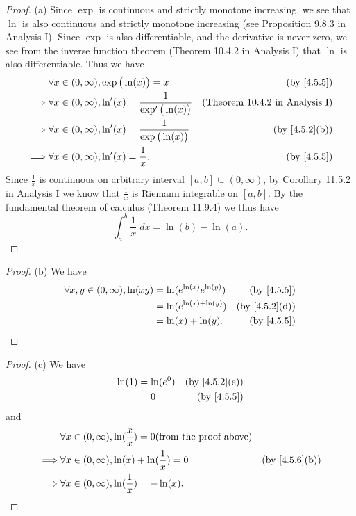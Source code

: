 \begin{proof}{(a)}
  Since \(\exp\) is continuous and strictly monotone increasing, we see that \(\ln\) is also continuous and strictly monotone increasing (see Proposition 9.8.3 in Analysis I).
  Since \(\exp\) is also differentiable, and the derivative is never zero, we see from the inverse function theorem (Theorem 10.4.2 in Analysis I) that \(\ln\) is also differentiable.
  Thus we have
  \begin{align*}
             & \forall x \in (0, \infty), \exp\big(\ln(x)\big) = x                  & \text{(by \cref{4.5.5})}              \\
    \implies & \forall x \in (0, \infty), \ln'(x) = \frac{1}{\exp'\big(\ln(x)\big)} & \text{(Theorem 10.4.2 in Analysis I)} \\
    \implies & \forall x \in (0, \infty), \ln'(x) = \frac{1}{\exp\big(\ln(x)\big)}  & \text{(by \cref{4.5.2}(b))}           \\
    \implies & \forall x \in (0, \infty), \ln'(x) = \frac{1}{x}.                    & \text{(by \cref{4.5.5})}
  \end{align*}
  Since \(\frac{1}{x}\) is continuous on arbitrary interval \([a, b] \subseteq (0, \infty)\), by Corollary 11.5.2 in Analysis I we know that \(\frac{1}{x}\) is Riemann integrable on \([a, b]\).
  By the fundamental theorem of calculus (Theorem 11.9.4) we thus have
  \[
    \int_a^b \frac{1}{x} \; dx = \ln(b) - \ln(a).
  \]
\end{proof}

\begin{proof}{(b)}
  We have
  \begin{align*}
    \forall x, y \in (0, \infty), \ln(xy) & = \ln(e^{\ln(x)} e^{\ln(y)}) & \text{(by \cref{4.5.5})}    \\
                                          & = \ln(e^{\ln(x) + \ln(y)})   & \text{(by \cref{4.5.2}(d))} \\
                                          & = \ln(x) + \ln(y).           & \text{(by \cref{4.5.5})}
  \end{align*}
\end{proof}

\begin{proof}{(c)}
  We have
  \begin{align*}
    \ln(1) & = \ln(e^0) & \text{(by \cref{4.5.2}(e))} \\
           & = 0        & \text{(by \cref{4.5.5})}
  \end{align*}
  and
  \begin{align*}
             & \forall x \in (0, \infty), \ln(\frac{x}{x}) = 0 \text{(from the proof above)}                               \\
    \implies & \forall x \in (0, \infty), \ln(x) + \ln(\frac{1}{x}) = 0                      & \text{(by \cref{4.5.6}(b))} \\
    \implies & \forall x \in (0, \infty), \ln(\frac{1}{x}) = -\ln(x).
  \end{align*}
\end{proof}

